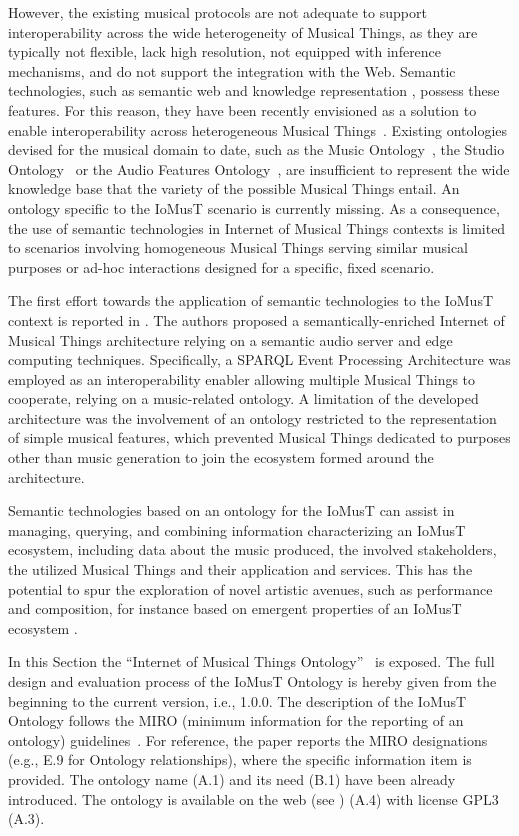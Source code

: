 However, the existing musical protocols are not adequate to support interoperability across the wide heterogeneity of Musical Things, as they are typically not flexible, lack high resolution, not equipped with inference mechanisms, and do not support the integration with the Web. Semantic technologies, such as semantic web \cite{berners2001semantic} and knowledge representation \cite{sowa2000knowledge}, possess these features. For this reason, they have been recently envisioned as a solution to enable interoperability across heterogeneous Musical Things~\cite{turchet2018IoMusT}. Existing ontologies devised for the musical domain to date, such as the Music Ontology~, the Studio Ontology~ or the Audio Features Ontology~, are insufficient to represent the wide knowledge base that the variety of the possible Musical Things entail. An ontology specific to the IoMusT scenario is currently missing. As a consequence, the use of semantic technologies in Internet of Musical Things contexts is limited to scenarios involving homogeneous Musical Things serving similar musical purposes or ad-hoc interactions designed for a specific, fixed scenario. 

The first effort towards the application of semantic technologies to the IoMusT context is reported in \cite{turchet2018sepa}. The authors proposed a semantically-enriched Internet of Musical Things architecture relying on a semantic audio server and edge computing techniques. Specifically, a SPARQL Event Processing Architecture \cite{roffia2018dynamic} was employed as an interoperability enabler allowing multiple Musical Things to cooperate, relying on a music-related ontology. A limitation of the developed architecture was the involvement of an ontology restricted to the representation of simple musical features, which prevented Musical Things dedicated to purposes other than music generation to join the ecosystem formed around the architecture.

Semantic technologies based on an ontology for the IoMusT can assist in managing, querying, and combining information characterizing an IoMusT ecosystem, including data about the music produced, the involved stakeholders, the utilized Musical Things and their application and services. This has the potential to spur the exploration of novel artistic avenues, such as performance and composition, for instance based on emergent properties of an IoMusT ecosystem \cite{ulieru2011emergent}. 

In this Section the ``Internet of Musical Things Ontology''~ is exposed. The full design and evaluation process of the IoMusT Ontology is hereby given from the beginning to the current version, i.e., 1.0.0. The description of the IoMusT Ontology follows the MIRO (minimum information for the reporting of an ontology) guidelines~\cite{matentzoglu2018miro}. For reference, the paper reports the MIRO designations (e.g., E.9 for Ontology relationships), where the specific information item is provided. The ontology name (A.1) and its need (B.1) have been already introduced. The ontology is available on the web (see ) (A.4) with license GPL3 (A.3).

